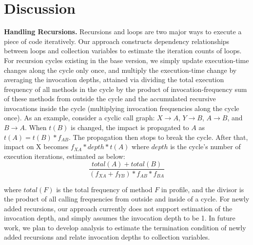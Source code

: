 \section{Discussion}
\label{sec:discuss}

\textbf{Handling Recursions.} Recursions and loops are two major ways to execute a piece of code iteratively. Our approach constructs dependency relationships between loops and collection variables to estimate the iteration counts of loops. For recursion cycles existing in the base version, we simply update execution-time changes along the cycle only once, and multiply the execution-time change by averaging the invocation depths, attained via dividing the total execution frequency of all methods in the cycle by the product of invocation-frequency sum of these methods from outside the cycle and the accumulated recursive invocations inside the cycle (multiplying invocation frequencies along the cycle once). As an example, consider a cyclic call graph: $X \to A$, $Y \to B$, $A \to B$, and $B \to A$. When $t(B)$ is changed, the impact is propagated to $A$ as $t(A)=t(B)*f_{AB}$. The propagation then stops to break the cycle. After that, impact on X becomes $f_{XA}*depth*t(A)$ where $depth$ is the cycle's number of execution iterations, estimated as below:  
\vspace{-0.15cm}
\begin{equation}
\frac{total(A)+total(B)}{(f_{XA}+f_{YB})*f_{AB}*f_{BA}}
\end{equation}

\noindent where $total(F)$ is the total frequency of method $F$ in profile, and the divisor is the product of all calling frequencies from outside and inside of a cycle. For newly added recursions, our approach currently does not support estimation of the invocation depth, and simply assumes the invocation depth to be 1. In future work, we plan to develop analysis to estimate the termination condition of newly added recursions and relate invocation depths to collection variables.


